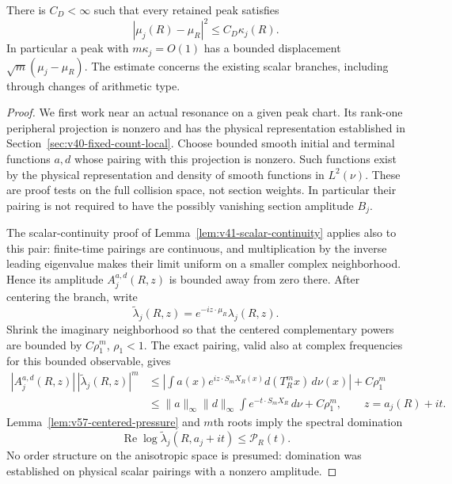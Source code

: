 \begin{theorem}
\label{thm:v57-damped-drift}
There is $C_D<\infty$ such that every retained peak satisfies
\begin{equation}\label{eq:v57-drift-damping}
                  |\mu_j(R)-\mu_R|^2\le C_D\kappa_j(R).
\end{equation}
In particular a peak with $m\kappa_j=O(1)$ has a bounded displacement
$\sqrt m(\mu_j-\mu_R)$. The estimate concerns the existing scalar
branches, including through changes of arithmetic type.
\end{theorem}
\begin{proof}
We first work near an actual resonance on a given peak chart. Its
rank-one peripheral projection is nonzero and has the physical
representation established in Section~\ref{sec:v40-fixed-count-local}.
Choose bounded smooth initial and terminal functions $a,d$ whose
pairing with this projection is nonzero. Such functions exist by the
physical representation and density of smooth functions in $L^2(\nu)$.
These are proof tests on the full collision space, not section weights.
In particular their pairing is not required to have the possibly
vanishing section amplitude $B_j$.

The scalar-continuity proof of Lemma~\ref{lem:v41-scalar-continuity}
applies also to this pair: finite-time pairings are continuous, and
multiplication by the inverse leading eigenvalue makes their limit
uniform on a smaller complex neighborhood. Hence its amplitude
$A_j^{a,d}(R,z)$ is bounded away from zero there. After centering the
branch, write
\[
 \widetilde\lambda_j(R,z)=e^{-iz\cdot\mu_R}\lambda_j(R,z).
\]
Shrink the imaginary neighborhood so that the centered complementary
powers are bounded by $C\rho_1^m$, $\rho_1<1$. The exact pairing,
valid also at complex frequencies for this bounded observable, gives
\begin{align*}
 |A_j^{a,d}(R,z)|\,|\widetilde\lambda_j(R,z)|^m
 &\le\left|\int a(x)e^{iz\cdot S_mX_R(x)}d(T_R^mx)\,d\nu(x)\right|
                       +C\rho_1^m\\
 &\le\|a\|_\infty\|d\|_\infty
                   \int e^{-t\cdot S_mX_R}\,d\nu+C\rho_1^m,
 \qquad z=a_j(R)+it.
\end{align*}
Lemma~\ref{lem:v57-centered-pressure} and $m$th roots imply the
spectral domination
\begin{equation}\label{eq:v57-spectral-pressure}
 \operatorname{Re}\log\widetilde\lambda_j(R,a_j+it)
                                       \le\mathscr P_R(t).
\end{equation}
No order structure on the anisotropic space is presumed: domination
was established on physical scalar pairings with a nonzero amplitude.


\end{proof}
